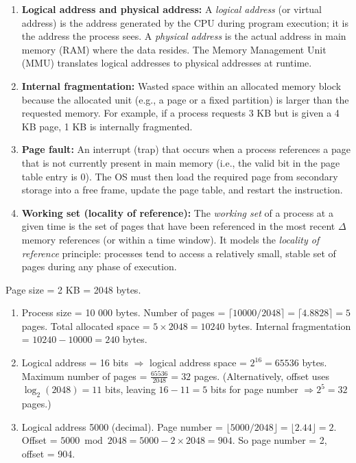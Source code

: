 \documentclass[11pt]{article}
\begin{document}
\begin{corrige}
\begin{enumerate}
\item \textbf{Logical address and physical address:} A \emph{logical address} (or virtual address) is the address generated by the CPU during program execution; it is the address the process sees. A \emph{physical address} is the actual address in main memory (RAM) where the data resides. The Memory Management Unit (MMU) translates logical addresses to physical addresses at runtime.

\item \textbf{Internal fragmentation:} Wasted space within an allocated memory block because the allocated unit (e.g., a page or a fixed partition) is larger than the requested memory. For example, if a process requests 3 KB but is given a 4 KB page, 1 KB is internally fragmented.

\item \textbf{Page fault:} An interrupt (trap) that occurs when a process references a page that is not currently present in main memory (i.e., the valid bit in the page table entry is 0). The OS must then load the required page from secondary storage into a free frame, update the page table, and restart the instruction.

\item \textbf{Working set (locality of reference):} The \emph{working set} of a process at a given time is the set of pages that have been referenced in the most recent $\Delta$ memory references (or within a time window). It models the \emph{locality of reference} principle: processes tend to access a relatively small, stable set of pages during any phase of execution.
\end{enumerate}
\end{corrige}

\begin{corrige}
Page size = 2 KB = 2048 bytes.
\begin{enumerate}
\item Process size = 10 000 bytes.  
Number of pages = $\lceil 10000 / 2048 \rceil = \lceil 4.8828 \rceil = 5$ pages.  
Total allocated space = $5 \times 2048 = 10240$ bytes.  
Internal fragmentation = $10240 - 10000 = 240$ bytes.

\item Logical address = 16 bits $\Rightarrow$ logical address space = $2^{16} = 65536$ bytes.  
Maximum number of pages = $\frac{65536}{2048} = 32$ pages. (Alternatively, offset uses $\log_2(2048)=11$ bits, leaving $16-11=5$ bits for page number $\Rightarrow 2^5=32$ pages.)

\item Logical address 5000 (decimal).  
Page number = $\lfloor 5000 / 2048 \rfloor = \lfloor 2.44 \rfloor = 2$.  
Offset = $5000 \bmod 2048 = 5000 - 2\times2048 = 904$.  
So page number = 2, offset = 904.
\end{enumerate}
\end{corrige}
\end{document}
